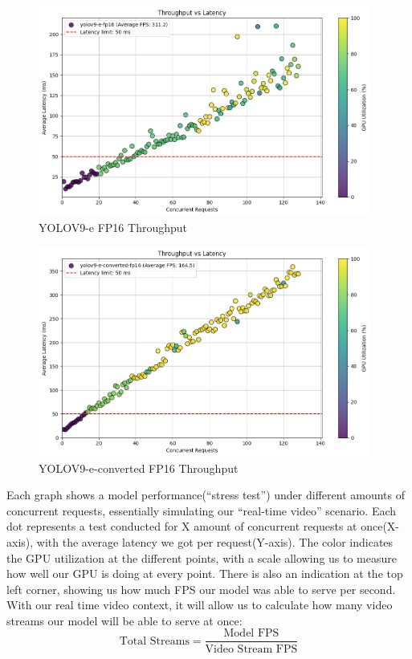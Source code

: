 \documentclass[
]{article}
\begin{document}
\begin{figure}[H]

{\centering \includegraphics[width=4.30556in,height=\textheight,keepaspectratio]{../images/throughput_yolov9_e_fp16.png}

}

\caption{YOLOV9-e FP16 Throughput}

\end{figure}%

\begin{figure}[H]

{\centering \includegraphics[width=4.30556in,height=\textheight,keepaspectratio]{../images/throughput_yolov9_e_converted_fp16.png}

}

\caption{YOLOV9-e-converted FP16 Throughput}

\end{figure}%

Each graph shows a model performance(``stress test'') under different
amounts of concurrent requests, essentially simulating our ``real-time
video'' scenario. Each dot represents a test conducted for X amount of
concurrent requests at once(X-axis), with the average latency we got per
request(Y-axis). The color indicates the GPU utilization at the
different points, with a scale allowing us to measure how well our GPU
is doing at every point. There is also an indication at the top left
corner, showing us how much FPS our model was able to serve per second.
With our real time video context, it will allow us to calculate how many
video streams our model will be able to serve at once: \[
\text{Total Streams} = \frac{\text{Model FPS}}{\text{Video Stream FPS}}
\]
\end{document}
